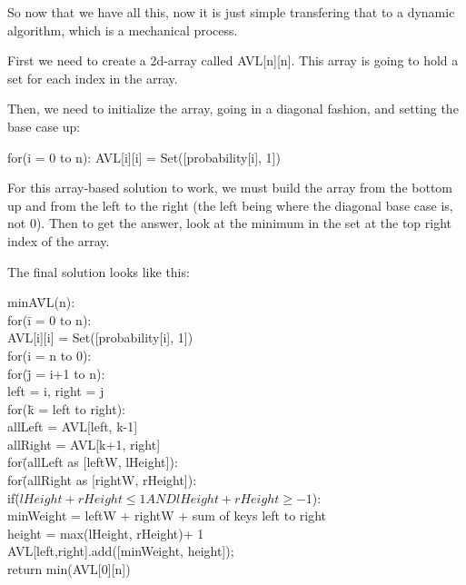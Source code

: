 \documentclass{article}
\begin{document}
\begin{enumerate}
So now that we have all this, now it is just simple transfering that to a dynamic algorithm, which is a mechanical process.

First we need to create a 2d-array called AVL[n][n]. This array is going to hold a set for each index in the array. 

Then, we need to initialize the array, going in a diagonal fashion, and setting the base case up:

for(i = 0 to n):
  AVL[i][i] = Set([probability[i], 1])

For this array-based solution to work, we must build the array from the bottom up and from the left to the right (the left being where the diagonal base case is, not 0). Then to get the answer, look at the minimum in the set at the top right index of the array. 

The final solution looks like this:

\begin{tabbing}
minA\=VL(n):\\
\>	for(\=i = 0 to n):\\
\>\>	AVL[i][i] = Set([probability[i], 1])\\
\>	for(i = n to 0):\\
\>\>	for(\=j = i+1 to n):\\
\>\>\>		left = i, right = j\\
\>\>\>		for(\=k = left to right):\\
\>\>\>\>		allLeft = AVL[left, k-1]\\
\>\>\>\>		allRight = AVL[k+1, right]\\
\>\>\>\>	 	for\=(allLeft as [leftW, lHeight]):\\
\>\>\>\>\>			for\=(allRight as [rightW, rHeight]): \\
\>\>\>\>\>\>			if\=($lHeight + rHeight \le 1 AND lHeight + rHeight \ge -1$):\\
\>\>\>\>\>\>				minWeight = leftW + rightW + sum of keys left to right\\
\>\>\>\>\>\>				height = max(lHeight, rHeight)+ 1\\
\>\>\>\>\>\>				AVL[left,right].add([minWeight, height]);\\
\> return min(AVL[0][n])\\
\end{tabbing}




\end{enumerate}
\end{document}
